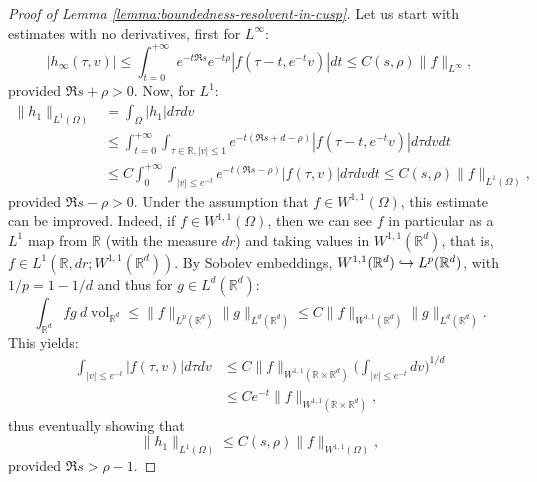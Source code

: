 \documentclass[10pt]{amsart}
\newcommand\hto{\mathrel{\lhook\joinrel\to}}
\newcommand{\R}{\mathbb{R}}
\DeclareMathOperator{\vol}{\mathrm{vol}}
\theoremstyle{plain}
\theoremstyle{definition}
\begin{document}
\begin{proof}[Proof of Lemma \ref{lemma:boundedness-resolvent-in-cusp}]
Let us start with estimates with no derivatives, first for $L^\infty$:
\[
|h_\infty(\tau,v)| \leq \int_{t=0}^{+\infty} e^{-t \Re s} e^{- t\rho} |f(\tau-t,e^{-t}v)| dt \leq C(s,\rho) \|f\|_{L^\infty},
\]
provided $\Re s+ \rho >0$. Now, for $L^1$:
\[
\begin{split}
\|h_1\|_{L^1(\Omega)} & = \int_{\Omega} |h_1| d\tau dv \\
& \leq \int_{t=0}^{+\infty} \int_{\tau \in \R, |v|\leq 1} e^{-t(\Re s+d-\rho)} |f(\tau - t, e^{-t} v)| d\tau dv dt \\
& \leq C \int_0^{+\infty} \int_{|v|\leq e^{-t} } e^{-t(\Re s -\rho)} |f(\tau, v)| d\tau dv dt \leq C(s,\rho) \|f\|_{L^1(\Omega)},
\end{split}
\]
provided $\Re s - \rho > 0$. Under the assumption that $f \in W^{1,1}(\Omega)$, this estimate can be improved. Indeed, if $f\in W^{1,1}(\Omega)$, then we can see $f$ in particular as a $L^1$ map from $\R$ (with the measure $dr$) and taking values in $W^{1,1}(\R^d)$, that is, $f \in L^1(\R, dr ; W^{1,1}(\R^d))$. By Sobolev embeddings, $W^{1,1}(\R^d) \hto L^p(\R^d)$, with $1/p = 1-1/d$ and thus for $g\in L^{d}(\R^d)$:
\[
\int_{\R^d} f g~ d\vol_{\R^d} \leq \|f\|_{L^p(\R^d)} \|g\|_{L^d(\R^d)} \leq C \| f \|_{W^{1,1}(\R^d)} \|g \|_{L^{d}(\R^d)}.
\]
This yields:
\begin{equation}
\label{equation:sioux}
\begin{split}
\int_{|v|\leq e^{-t} } |f(\tau,v)| d\tau dv & \leq C\|f\|_{W^{1,1}(\R \times \R^d)} \biggl( \int_{ |v|\leq e^{-t} } dv \biggr)^{1/d} \\
& \leq C e^{-t} \|f\|_{W^{1,1}(\R \times \R^d)},
\end{split}
\end{equation}
thus eventually showing that
\[
\|h_1\|_{L^1(\Omega)} \leq C(s,\rho) \|f\|_{W^{1,1}(\Omega)},
\]
provided $\Re s > \rho -1$.


\end{proof}
\end{document}
